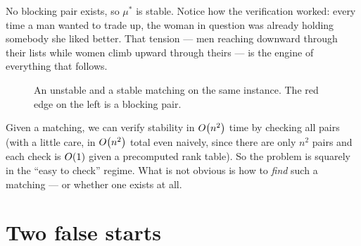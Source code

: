 No blocking pair exists, so $\mu^*$ is stable. Notice how the verification
worked: every time a man wanted to trade up, the woman in question was already
holding somebody she liked better. That tension --- men reaching downward
through their lists while women climb upward through theirs --- is the engine
of everything that follows.

\begin{figure}[ht]
\centering
{}
\caption{An unstable and a stable matching on the same instance. The red edge
on the left is a blocking pair.}
\label{fig:sm-stable-vs-unstable}
\end{figure}

\begin{remark}
Given a matching, we can verify stability in $O\!\left(n^2\right)$ time by checking all
pairs (with a little care, in $O\!\left(n^2\right)$ total even naively, since there
are only $n^2$ pairs and each check is $O\!\left(1\right)$ given a precomputed rank
table). So the problem is squarely in the ``easy to check'' regime. What is
not obvious is how to \emph{find} such a matching --- or whether one exists at
all.
\end{remark}

\section{Two false starts}\label{sec:sm-naive}

